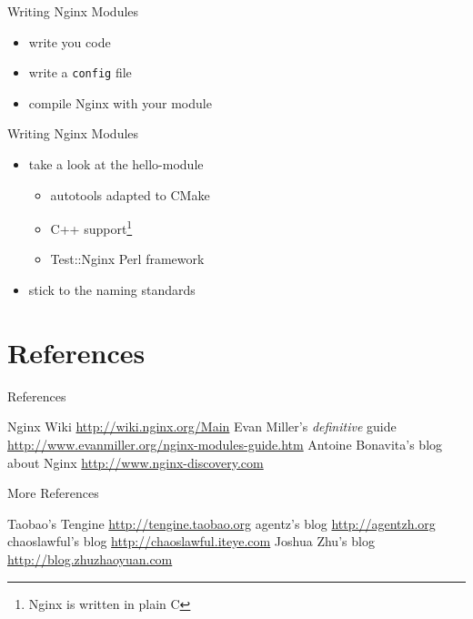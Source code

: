 \documentclass{beamer}
\begin{document}
\begin{frame}[fragile]{Writing Nginx Modules}
\begin{itemize}
 \item write you code
 \item write a \verb|config| file
 \item compile Nginx with your module
\end{itemize}
\end{frame}

\begin{frame}{Writing Nginx Modules}
\begin{itemize}
 \item take a look at the hello-module
 \begin{itemize}
  \item autotools adapted to CMake
  \item C++ support\footnote{Nginx is written in plain C}
  \item Test::Nginx Perl framework
 \end{itemize}
\item stick to the naming standards
\end{itemize}
\end{frame}

\section{References}

\begin{frame}{References}
\begin{thebibliography}{10}
  Nginx Wiki 
  \newblock \url{http://wiki.nginx.org/Main}
  Evan Miller's \emph{definitive} guide 
  \newblock \url{http://www.evanmiller.org/nginx-modules-guide.htm}
  Antoine Bonavita's blog about Nginx
  \newblock \url{http://www.nginx-discovery.com}
\end{thebibliography}
\end{frame}

\begin{frame}{More References}
\begin{thebibliography}{10}
  Taobao's Tengine
  \newblock \url{http://tengine.taobao.org}
  agentz's blog
  \newblock \url{http://agentzh.org}
  chaoslawful's blog
  \newblock \url{http://chaoslawful.iteye.com}
  Joshua Zhu’s blog
  \newblock \url{http://blog.zhuzhaoyuan.com}
\end{thebibliography}
 
\end{frame}
\end{document}
